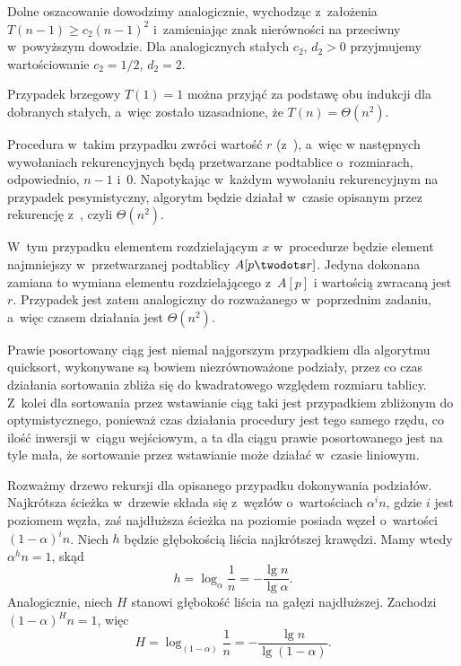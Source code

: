 Dolne oszacowanie dowodzimy analogicznie, wychodząc z~założenia $T(n-1)\ge c_2(n-1)^2$ i~zamieniając znak nierówności na przeciwny w~powyższym dowodzie. Dla analogicznych stałych $c_2$, $d_2>0$ przyjmujemy wartościowanie $c_2=1/2$, $d_2=2$.

Przypadek brzegowy $T(1)=1$ można przyjąć za podstawę obu indukcji dla dobranych stałych, a~więc zostało uzasadnione, że $T(n)=\Theta(n^2)$.

\exercise %
Procedura  w~takim przypadku zwróci wartość $r$ (z~), a~więc w następnych wywołaniach rekurencyjnych będą przetwarzane podtablice o~rozmiarach, odpowiednio, $n-1$ i~0. Napotykając w~każdym wywołaniu rekurencyjnym na przypadek pesymistyczny, algorytm będzie działał w~czasie opisanym przez rekurencję z~, czyli $\Theta(n^2)$.

\exercise %
W~tym przypadku elementem rozdzielającym $x$ w~procedurze  będzie element najmniejszy w~przetwarzanej podtablicy $A[p\twodots r]$. Jedyna dokonana zamiana to wymiana elementu rozdzielającego z~$A[p]$ i wartością zwracaną jest $r$. Przypadek jest zatem analogiczny do rozważanego w~poprzednim zadaniu, a~więc czasem działania  jest $\Theta(n^2)$.

\exercise %
Prawie posortowany ciąg jest niemal najgorszym przypadkiem dla algorytmu quicksort, wykonywane są bowiem niezrównoważone podziały, przez co czas działania sortowania zbliża się do kwadratowego względem rozmiaru tablicy. Z~kolei dla sortowania przez wstawianie ciąg taki jest przypadkiem zbliżonym do optymistycznego, ponieważ czas działania procedury  jest tego samego rzędu, co ilość inwersji w~ciągu wejściowym, a ta dla ciągu prawie posortowanego jest na tyle mała, że sortowanie przez wstawianie może działać w~czasie liniowym.

\exercise %
Rozważmy drzewo rekursji dla opisanego przypadku dokonywania podziałów. Najkrótsza ścieżka w~drzewie składa się z~węzłów o~wartościach $\alpha^in$, gdzie $i$ jest poziomem węzła, zaś najdłuższa ścieżka na  poziomie posiada węzeł o~wartości $(1-\alpha)^in$. Niech $h$ będzie głębokością liścia najkrótszej krawędzi. Mamy wtedy $\alpha^hn=1$, skąd
\[
	h = \log_\alpha\frac{1}{n} = -\frac{\lg n}{\lg\alpha}.
\]
Analogicznie, niech $H$ stanowi głębokość liścia na gałęzi najdłuższej. Zachodzi $(1-\alpha)^Hn=1$, więc
\[
	H = \log_{(1-\alpha)}\frac{1}{n} = -\frac{\lg n}{\lg(1-\alpha)}.
\]

